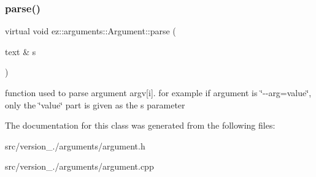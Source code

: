 \subsubsection{\texorpdfstring{parse()}{parse()}}
{\footnotesize\ttfamily virtual void ez\+::arguments\+::\+Argument\+::parse (\begin{DoxyParamCaption}\item[{text \&}]{s }\end{DoxyParamCaption})\hspace{0.3cm}{\ttfamily [pure virtual]}}

function used to parse argument argv\mbox{[}i\mbox{]}. for example if argument is \char`\"{}-\/-\/arg=value\char`\"{}, only the \char`\"{}value\char`\"{} part is given as the s parameter 

The documentation for this class was generated from the following files\+:\begin{DoxyCompactItemize}
\item 
src/version\+\_./arguments/argument.\+h\item 
src/version\+\_./arguments/argument.\+cpp\end{DoxyCompactItemize}
